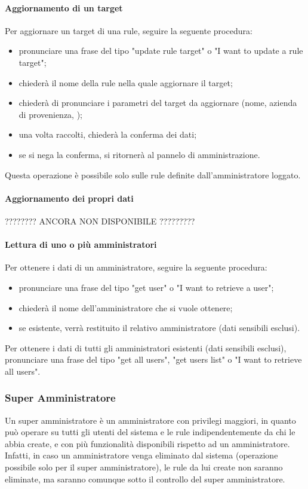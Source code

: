 \paragraph{Aggiornamento di un target}\label{updateRuleTarget}
Per aggiornare un target di una rule, seguire la seguente procedura:
\begin{itemize}
	\item pronunciare una frase del tipo "update rule target" o "I want to update a rule target";
	\item \PROGETTO{} chiederà il nome della rule nella quale aggiornare il target;
	\item \PROGETTO{} chiederà di pronunciare i parametri del target da aggiornare (nome, azienda di provenienza, );
	\item una volta raccolti, \PROGETTO{} chiederà la conferma dei dati;
	\item se si nega la conferma, si ritornerà al pannelo di amministrazione.
\end{itemize}
Questa operazione è possibile solo sulle rule definite dall'amministratore loggato.
\paragraph{Aggiornamento dei propri dati}
???????? ANCORA NON DISPONIBILE ?????????
\paragraph{Lettura di uno o più amministratori}
Per ottenere i dati di un amministratore, seguire la seguente procedura:
\begin{itemize}
	\item pronunciare una frase del tipo "get user" o "I want to retrieve a user";
	\item \PROGETTO{} chiederà il nome dell'amministratore che si vuole ottenere;
	\item se esistente, verrà restituito il relativo amministratore (dati sensibili esclusi).
\end{itemize}

Per ottenere i dati di tutti gli amministratori esistenti (dati sensibili esclusi), pronunciare una frase del tipo "get all users", "get users list" o "I want to retrieve all users".
\subsubsection{Super Amministratore}\label{superAdmin}
Un super amministratore è un amministratore con privilegi maggiori, in quanto può operare su tutti gli utenti del sistema e le rule indipendentemente da chi le abbia create, e con più funzionalità disponibili rispetto ad un amministratore. \\
Infatti, in caso un amministratore venga eliminato dal sistema (operazione possibile solo per il super amministratore), le rule da lui create non saranno eliminate, ma saranno comunque sotto il controllo del super amministratore. 
